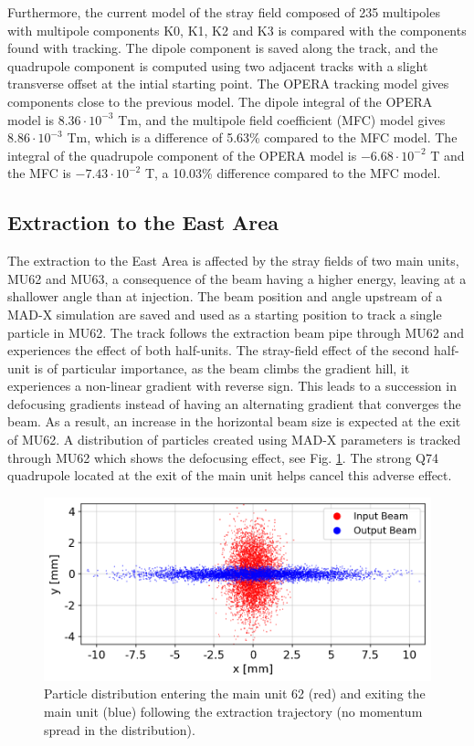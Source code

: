 \documentclass[a4paper,
               biblatex,     %
               keeplastbox,   %
               ]{jacow}
\begin{document}
Furthermore, the current model of the stray field composed of 235 multipoles with multipole components K0, K1, K2 and K3 is compared with the components found with tracking. The dipole component is saved along the track, and the quadrupole component is computed using two adjacent tracks with a slight transverse offset at the intial starting point. The OPERA tracking model gives components close to the previous model. The dipole integral of the OPERA model is $8.36\cdot10^{-3}$ Tm, and the multipole field coefficient (MFC) model gives $8.86\cdot10^{-3}$ Tm, which is a difference of 5.63\% compared to the MFC model. The integral of the quadrupole component of the OPERA model is $-6.68\cdot10^{-2}$ T and the MFC is $-7.43\cdot10^{-2}$ T, a 10.03\% difference compared to the MFC model.


\subsection{Extraction to the East Area}
The extraction to the East Area is affected by the stray fields of two main units, MU62 and MU63, a consequence of the beam having a higher energy, leaving at a shallower angle than at injection. The beam position and angle upstream of a MAD-X simulation are saved and used as a starting position to track a single particle in MU62. The track follows the extraction beam pipe through MU62 and experiences the effect of both half-units. The stray-field effect of the second half-unit is of particular importance, as the beam climbs the gradient hill, it experiences a non-linear gradient with reverse sign. This leads to a succession in defocusing gradients instead of having an alternating gradient that converges the beam. As a result, an increase in the horizontal beam size is expected at the exit of MU62. A distribution of particles created using MAD-X parameters is tracked through MU62 which shows the defocusing effect, see Fig. \ref{fig:particle_distribution}. The strong Q74 quadrupole located at the exit of the main unit helps cancel this adverse effect.

\begin{figure}[!htb]
   \centering
   \includegraphics*[width=1.0\columnwidth]{MOPOTK030_f7.png}
   \caption{Particle distribution entering the main unit 62 (red) and exiting the main unit (blue) following the extraction trajectory (no momentum spread in the distribution).}
   \label{fig:particle_distribution}
\end{figure}
\end{document}
